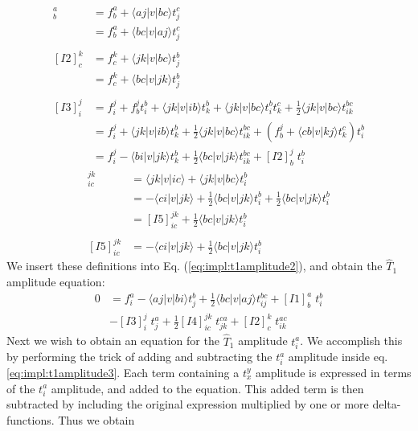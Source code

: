 \begin{align}
[I1]_b^a&=f_{b}^{a}+\langle aj|v|bc\rangle t_j^c\nonumber\\
&=f_{b}^{a}+\langle bc|v|aj\rangle t_j^c\label{eq:impl:t1intermediates1}\\
\nonumber\\
[I2]_c^k&=f_{c}^{k}+\langle jk|v|bc\rangle t_j^b\nonumber\\
&=f_{c}^{k}+\langle bc|v|jk\rangle t_j^b\label{eq:impl:t1intermediates2}\\
\nonumber\\
[I3]_i^j&=f_{i}^{j}+f_b^jt_i^b+\langle jk|v|ib\rangle t_{k}^{b}+\langle jk|v|bc\rangle t_i^bt_k^c+\frac{1}{2}\langle jk|v|bc\rangle t_{ik}^{bc}\nonumber\\
&=f_{i}^{j}+\langle jk|v|ib\rangle t_{k}^{b}+\frac{1}{2}\langle jk|v|bc\rangle t_{ik}^{bc}+\left(f_b^j+\langle cb|v|kj\rangle t_k^c\right)t_i^b\nonumber\\
&=f_{i}^{j}-\langle bi|v|jk\rangle t_{k}^{b}+\frac{1}{2}\langle bc|v|jk\rangle t_{ik}^{bc}+[I2]_b^j\phantom{.}t_i^b
\label{eq:impl:t1intermediates3}
\end{align}
%
\begin{align}
[I4]_{ic}^{jk}&=\langle jk|v|ic\rangle +\langle jk|v|bc\rangle t_i^b\nonumber\\
&=-\langle ci|v|jk\rangle+\frac{1}{2}\langle bc|v|jk\rangle t_i^b+\frac{1}{2}\langle bc|v|jk\rangle t_i^b\nonumber\\
&=[I5]_{ic}^{jk}+\frac{1}{2}\langle bc|v|jk\rangle t_i^b\label{eq:impl:t1intermediates4}\\
\nonumber\\
[I5]_{ic}^{jk}&=-\langle ci|v|jk\rangle+\frac{1}{2}\langle bc|v|jk\rangle t_i^b\label{eq:impl:t1intermediates5}
\end{align}
We insert these definitions into Eq. (\ref{eq:impl:t1amplitude2}), and obtain the $\hat{T}_1$ amplitude equation:
\begin{align}
0&=f_i^a - \langle aj|v|bi \rangle t_{j}^{b}+\frac{1}{2}\langle bc|v|aj\rangle t_{ij}^{bc}+[I1]_b^a\phantom{.}t_i^b\nonumber\\
&-[I3]_i^j\phantom{.}t_{j}^{a}+\frac{1}{2}[I4]_{ic}^{jk}\phantom{.}t_{jk}^{ca}+[I2]_c^k\phantom{.}t_{ik}^{ac}
\label{eq:impl:t1amplitude3}
\end{align}
Next we wish to obtain an equation for the $\hat{T}_1$ amplitude $t_i^a$. We accomplish this by performing the trick of adding and subtracting the $t_i^a$ amplitude inside eq. \ref{eq:impl:t1amplitude3}. Each term containing a $t_x^y$ amplitude is expressed in terms of the $t_i^a$ amplitude, and added to the equation. This added term is then subtracted by including the original expression multiplied by one or more delta-functions. Thus we obtain

